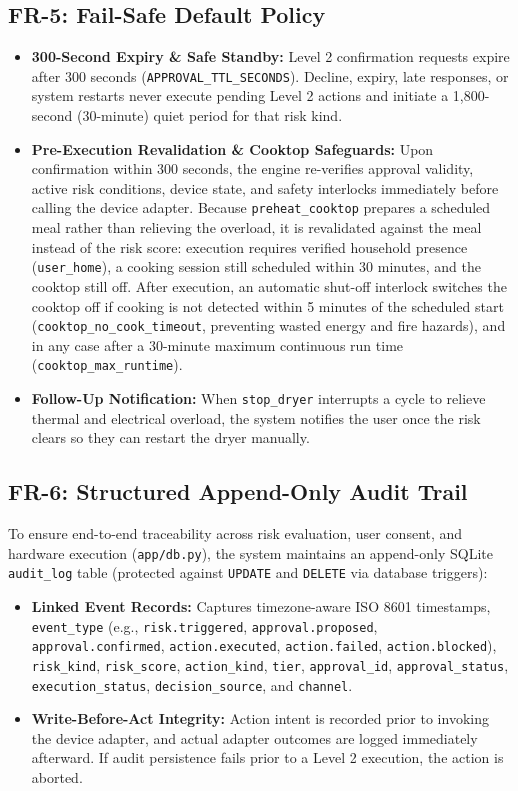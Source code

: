 \documentclass[conference]{IEEEtran}
\begin{document}
\subsection{FR-5: Fail-Safe Default Policy}
\begin{itemize}
    \item \textbf{300-Second Expiry \& Safe Standby:} Level 2 confirmation requests expire after 300 seconds (\texttt{APPROVAL\_TTL\_SECONDS}). Decline, expiry, late responses, or system restarts never execute pending Level 2 actions and initiate a 1,800-second (30-minute) quiet period for that risk kind.
    \item \textbf{Pre-Execution Revalidation \& Cooktop Safeguards:} Upon confirmation within 300 seconds, the engine re-verifies approval validity, active risk conditions, device state, and safety interlocks immediately before calling the device adapter. Because \texttt{preheat\_cooktop} prepares a scheduled meal rather than relieving the overload, it is revalidated against the meal instead of the risk score: execution requires verified household presence (\texttt{user\_home}), a cooking session still scheduled within 30 minutes, and the cooktop still off. After execution, an automatic shut-off interlock switches the cooktop off if cooking is not detected within 5 minutes of the scheduled start (\texttt{cooktop\_no\_cook\_timeout}, preventing wasted energy and fire hazards), and in any case after a 30-minute maximum continuous run time (\texttt{cooktop\_max\_runtime}).
    \item \textbf{Follow-Up Notification:} When \texttt{stop\_dryer} interrupts a cycle to relieve thermal and electrical overload, the system notifies the user once the risk clears so they can restart the dryer manually.
\end{itemize}

\subsection{FR-6: Structured Append-Only Audit Trail}
To ensure end-to-end traceability across risk evaluation, user consent, and hardware execution (\texttt{app/db.py}), the system maintains an append-only SQLite \texttt{audit\_log} table (protected against \texttt{UPDATE} and \texttt{DELETE} via database triggers):
\begin{itemize}
    \item \textbf{Linked Event Records:} Captures timezone-aware ISO 8601 timestamps, \texttt{event\_type} (e.g., \texttt{risk.triggered}, \texttt{approval.proposed}, \texttt{approval.confirmed}, \texttt{action.executed}, \texttt{action.failed}, \texttt{action.blocked}), \texttt{risk\_kind}, \texttt{risk\_score}, \texttt{action\_kind}, \texttt{tier}, \texttt{approval\_id}, \texttt{approval\_status}, \texttt{execution\_status}, \texttt{decision\_source}, and \texttt{channel}.
    \item \textbf{Write-Before-Act Integrity:} Action intent is recorded prior to invoking the device adapter, and actual adapter outcomes are logged immediately afterward. If audit persistence fails prior to a Level 2 execution, the action is aborted.
\end{itemize}
\end{document}

